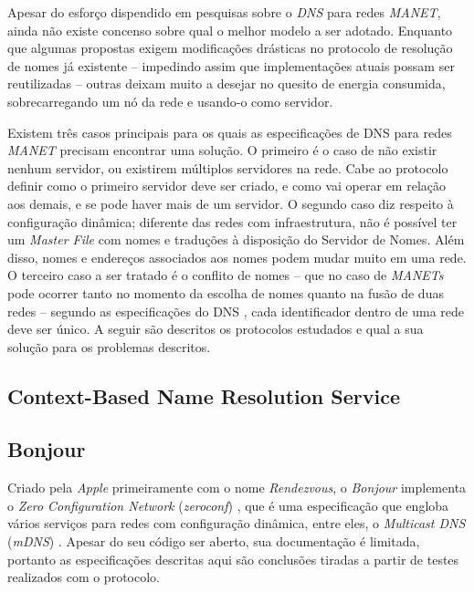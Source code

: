 
Apesar do esforço dispendido em pesquisas sobre o \textit{DNS} para redes 
\textit{MANET}, ainda não existe concenso sobre qual o melhor modelo a ser 
adotado. Enquanto que algumas propostas exigem modificações drásticas no 
protocolo de resolução de nomes já existente -- impedindo assim que 
implementações atuais possam ser reutilizadas -- outras deixam muito a desejar 
no quesito de energia consumida, sobrecarregando um nó da rede e usando-o como
 servidor.

Existem três casos principais para os quais as especificações de DNS para redes 
\textit{MANET} precisam encontrar uma solução. O primeiro é o caso de não existir 
nenhum servidor, ou existirem múltiplos servidores na rede. Cabe ao protocolo 
definir como o primeiro servidor deve ser criado, e como vai operar em relação 
aos demais, e se pode haver mais de um servidor. O segundo caso diz respeito à 
configuração dinâmica; diferente das redes com infraestrutura, não é possível 
ter um \textit{Master File} com nomes e traduções à disposição do Servidor de 
Nomes. Além disso, nomes e endereços associados aos nomes podem mudar muito em 
uma rede. O terceiro caso a ser tratado é o conflito de nomes -- que no caso de 
\textit{MANETs} pode ocorrer tanto no momento da escolha de nomes quanto na fusão
 de duas redes -- segundo as especificações do DNS \cite{rfc1035}, cada 
 identificador dentro de uma rede deve ser único. A seguir são descritos os 
 protocolos estudados e qual a sua solução para os problemas descritos.

\subsection{Context-Based Name Resolution Service}

\subsection{Bonjour}
\label{Bonjour}

    Criado pela \textit{Apple} primeiramente com o nome \textit{Rendezvous}, o 
    \textit{Bonjour} implementa o \textit{Zero Configuration Network} 
    (\textit{zeroconf}) \cite{zeroconf}, que é uma especificação que engloba vários
    serviços para redes com configuração dinâmica, entre eles, o 
    \textit{Multicast DNS} (\textit{mDNS}) \cite{mdns}. Apesar do seu código ser 
    aberto, sua documentação é limitada, portanto as especificações descritas aqui
    são conclusões tiradas a partir de testes realizados com o protocolo.
  
